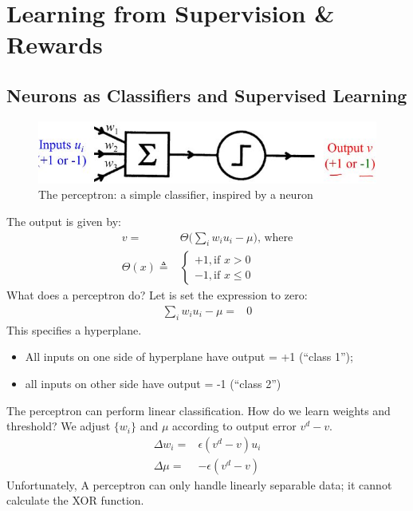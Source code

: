 \documentclass[]{article}
\begin{document}
\section{Learning from Supervision \& Rewards}\label{sec:week8}

\subsection{Neurons as Classifiers and Supervised Learning}

\begin{figure}[H]
	\begin{center}
		\caption{The perceptron: a simple classifier, inspired by a neuron}
		\includegraphics[width=\textwidth]{perceptron}
	\end{center}
\end{figure}

The output is given by:
\begin{align*}
	v =& \Theta\big(\sum_i w_i u_i - \mu\big)\text{, where}\\
	\Theta(x) \triangleq& \begin{cases}
		+1, \text{if $x>0$}\\
		-1, \text{if $x\le 0$}
	\end{cases}
\end{align*}
What does a perceptron do? Let is set the expression to zero:
\begin{align*}
	\sum_i w_i u_i - \mu=&0
\end{align*}
This specifies a hyperplane.
\begin{itemize}
	\item All inputs on one side of hyperplane have output = +1 (“class 1”);
	\item all inputs on other side have output = -1 (“class 2”)
\end{itemize}
The perceptron can perform linear classification. How do we learn weights and threshold? We adjust $\{w_i\}$ and $\mu$ according to output error $v^d-v$.
\begin{align*}
	\Delta w_i =& \epsilon(v^d-v)u_i\\
	\Delta \mu =& -\epsilon(v^d-v)
\end{align*}
Unfortunately, A perceptron can only handle linearly separable data; it cannot calculate the XOR function.
\end{document}
